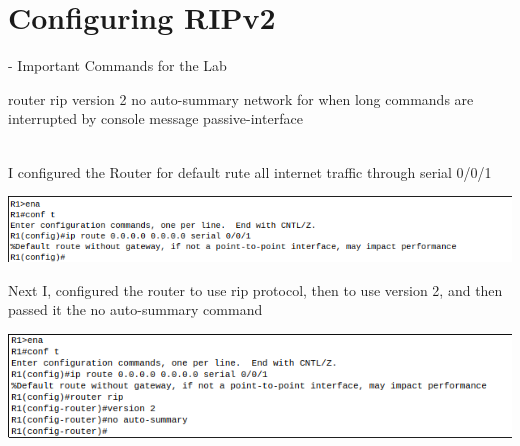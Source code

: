 \documentclass[../EngineeringJournal_CDavis.tex]{subfiles}
\begin{document}

\chapter[Configuring RIPv2]{Configuring \linebreak[1] RIPv2 \hspace*{\fill}{Jan 31, 2020}}

\hspace{0.2cm}
\begin{tcolorbox}[width=6.3in]
\scriptsize 
- Important Commands for the Lab
  \begin{outline}
    \1 router rip 
      \2 version 2
    \1 no auto-summary
    \1 network
      \2 for when long commands are interrupted by console message
    \1 passive-interface 
  \end{outline}
\end{tcolorbox}
\hspace{0.2cm}
\normalsize  

\newpage

\\
I configured the Router for default rute all internet traffic through serial 0/0/1

\begin{center}
  \includegraphics[scale=0.4]{Figures/2020-01-31-025239_663x87_scrot.png}
\end{center}

Next I, configured the router to use rip protocol, then to use version 2, and then passed it the no auto-summary command

\begin{center}
  \includegraphics[scale=0.4]{Figures/2020-01-31-025628_622x128_scrot.png}
\end{center}
\end{document}
